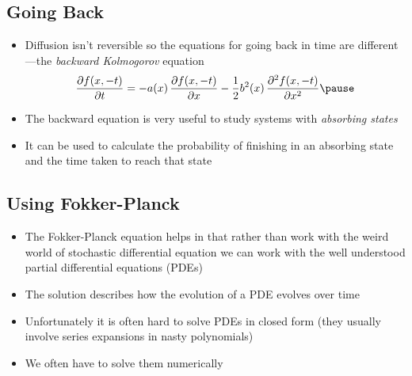 
\begin{slide}
\section[-1]{Going Back}

\begin{PauseHighLight}
  \begin{itemize}
  \item Diffusion isn't reversible so the equations for going back in
    time are different\pause---the \emph{backward Kolmogorov} equation
    \begin{displaymath}
      \frac{\partial f(x,-t)}{\partial t} =
      - a(x)\, \frac{\partial f(x,-t)}{\partial x}
      - \frac{1}{2} b^2(x)\, \frac{\partial^2 f(x,-t)}{\partial x^2}\pause
    \end{displaymath}
  \item The backward equation is very useful to study systems with
    \textit{absorbing states}\pause
  \item It can be used to calculate the probability of finishing in an
    absorbing state and the time taken to reach that state\pause
  \end{itemize}
\end{PauseHighLight}

\end{slide}


\begin{slide}
\section{Using Fokker-Planck}

\begin{PauseHighLight}
  \begin{itemize}
  \item The Fokker-Planck equation helps in that rather than work with
    the weird world of stochastic differential equation we can work with
    the well understood partial differential equations (PDEs)\pause
  \item The solution describes how the evolution of a PDE evolves over
    time\pause
  \item Unfortunately it is often hard to solve PDEs in closed form
    (they usually involve series expansions in nasty polynomials)\pause
  \item We often have to solve them numerically\pause
  \end{itemize}
\end{PauseHighLight}

\end{slide}

